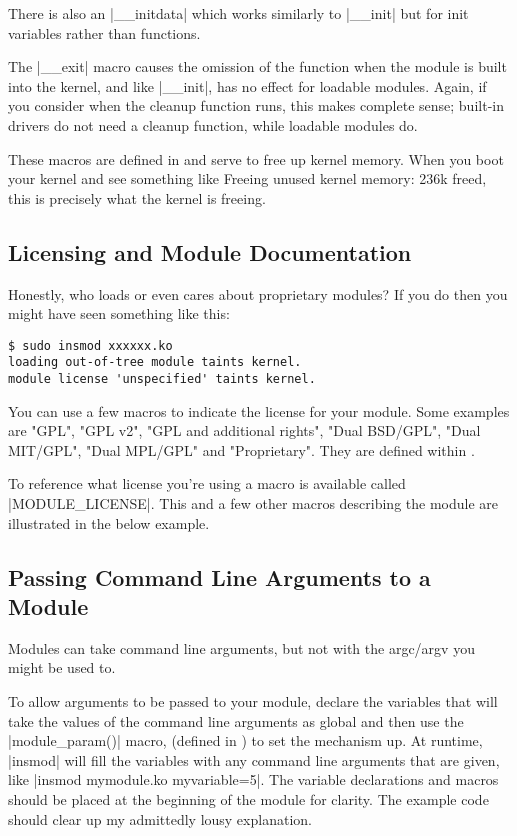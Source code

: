 \documentclass[10pt, oneside]{book}
\begin{document}
There is also an \cpp|__initdata| which works similarly to \cpp|__init| but for init variables rather than functions.

The \cpp|__exit| macro causes the omission of the function when the module is built into the kernel, and like \cpp|__init|, has no effect for loadable modules.
Again, if you consider when the cleanup function runs, this makes complete sense; built-in drivers do not need a cleanup function, while loadable modules do.

These macros are defined in  and serve to free up kernel memory.
When you boot your kernel and see something like Freeing unused kernel memory: 236k freed, this is precisely what the kernel is freeing.


\subsection{Licensing and Module Documentation}
\label{modlicense}
Honestly, who loads or even cares about proprietary modules?
If you do then you might have seen something like this:
\begin{verbatim}
$ sudo insmod xxxxxx.ko
loading out-of-tree module taints kernel.
module license 'unspecified' taints kernel.
\end{verbatim}

You can use a few macros to indicate the license for your module.
Some examples are "GPL", "GPL v2", "GPL and additional rights", "Dual BSD/GPL", "Dual MIT/GPL", "Dual MPL/GPL" and "Proprietary".
They are defined within .

To reference what license you're using a macro is available called \cpp|MODULE_LICENSE|.
This and a few other macros describing the module are illustrated in the below example.


\subsection{Passing Command Line Arguments to a Module}
\label{modparam}
Modules can take command line arguments, but not with the argc/argv you might be used to.

To allow arguments to be passed to your module, declare the variables that will take the values of the command line arguments as global and then use the \cpp|module_param()| macro, (defined in ) to set the mechanism up.
At runtime, \sh|insmod| will fill the variables with any command line arguments that are given, like \sh|insmod mymodule.ko myvariable=5|.
The variable declarations and macros should be placed at the beginning of the module for clarity.
The example code should clear up my admittedly lousy explanation.
\end{document}
